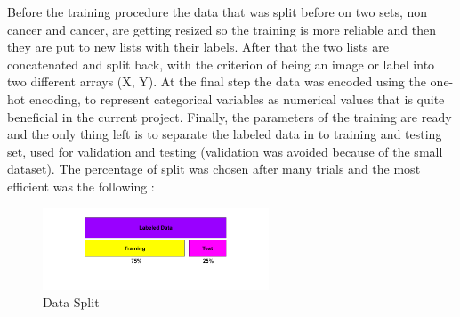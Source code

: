 Before the training procedure the data that was split before on two sets, non cancer and cancer, are getting resized so the training is more reliable and then they are put to new lists with their labels. After that the two lists are concatenated and split back, with the criterion of being an image or label into two different arrays (X, Y). At the final step the data was encoded using the one-hot encoding, to represent categorical variables as numerical values that is quite beneficial in the current project. Finally, the parameters of the training are ready and the only thing left is to separate the labeled data in to training and testing set, used for validation and testing (validation was avoided because of the small dataset). The percentage of split was chosen after many trials and the most efficient was the following :
\begin{figure}[H]
    \centering
    \includegraphics[width=0.6\textwidth]{Images/Data Split.png}
    \caption{Data Split}
    \label{fig:example}
\end{figure}